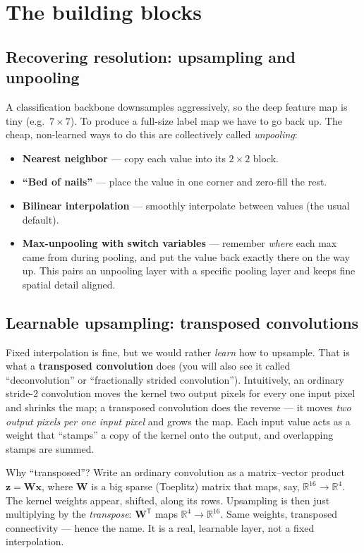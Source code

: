 \documentclass[11pt, oneside]{book}
\newcommand{\R}{\mathbb{R}}
\newcommand{\T}{^{\mathsf{T}}}
\newcommand{\xvec}{\mathbf{x}}
\newcommand{\zvec}{\mathbf{z}}
\begin{document}
\section{The building blocks}

\subsection{Recovering resolution: upsampling and unpooling}

A classification backbone downsamples aggressively, so the deep feature map is
tiny (e.g.\ $7\times 7$). To produce a full-size label map we have to go back up.
The cheap, non-learned ways to do this are collectively called \emph{unpooling}:

\begin{itemize}
  \item \textbf{Nearest neighbor} --- copy each value into its $2\times2$ block.
  \item \textbf{``Bed of nails''} --- place the value in one corner and zero-fill
        the rest.
  \item \textbf{Bilinear interpolation} --- smoothly interpolate between values
        (the usual default).
  \item \textbf{Max-unpooling with switch variables} --- remember \emph{where}
        each max came from during pooling, and put the value back exactly there
        on the way up. This pairs an unpooling layer with a specific pooling
        layer and keeps fine spatial detail aligned.
\end{itemize}

\subsection{Learnable upsampling: transposed convolutions}

Fixed interpolation is fine, but we would rather \emph{learn} how to upsample.
That is what a \textbf{transposed convolution} does (you will also see it called
``deconvolution'' or ``fractionally strided convolution''). Intuitively, an
ordinary stride-2 convolution moves the kernel two output pixels for every one
input pixel and shrinks the map; a transposed convolution does the reverse ---
it moves \emph{two output pixels per one input pixel} and grows the map. Each
input value acts as a weight that ``stamps'' a copy of the kernel onto the
output, and overlapping stamps are summed.

\begin{intbox}
Why ``transposed''? Write an ordinary convolution as a matrix--vector product
$\zvec = \mathbf{W}\xvec$, where $\mathbf{W}$ is a big sparse (Toeplitz) matrix
that maps, say, $\R^{16}\to\R^{4}$. The kernel weights appear, shifted, along
its rows. Upsampling is then just multiplying by the \emph{transpose}:
$\mathbf{W}\T$ maps $\R^{4}\to\R^{16}$. Same weights, transposed connectivity ---
hence the name. It is a real, learnable layer, not a fixed interpolation.
\end{intbox}
\end{document}
